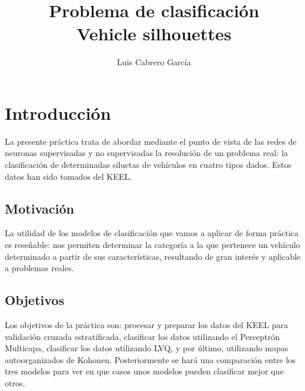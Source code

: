 \documentclass[11pt,spanish,listoffigures,listoftables]{workluis}
\title{Problema de clasificación \\
         Vehicle silhouettes}
\author{Luis Cabrero García}
\begin{document}

\makeindexes


\mainmatter


\chapter{Introducci\'on}

\par La presente práctica trata de abordar mediante el punto de vista de las redes de neuronas supervisadas y no supervisadas la resolución de un problema real: la clasificación de determinadas siluetas de vehículos en cuatro tipos dados. Estos datos han sido tomados del KEEL\cite{KEEL}.

\section{Motivaci\'on}

\par La utilidad de los modelos de clasificación que vamos a aplicar de forma práctica es reseñable: nos permiten determinar la categoría a la que pertenece un vehículo determinado a partir de sus características, resultando de gran interés y aplicable a problemas reales.

\section{Objetivos}

\par Los objetivos de la práctica son: procesar y preparar los datos del KEEL\cite{KEEL} para validación cruzada estratificada, clasificar los datos utilizando el Perceptrón Multicapa, clasificar los datos utilizando LVQ, y por último, utilizando mapas autoorganizados de Kohonen. Posteriormente se hará una comparación entre los tres modelos para ver en que casos unos modelos pueden clasificar mejor que otros.
\end{document}
